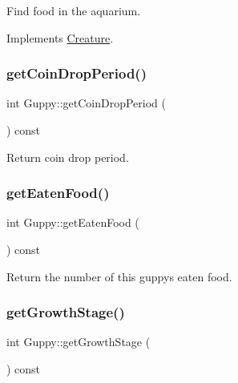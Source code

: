 Find food in the aquarium. 



Implements \mbox{\hyperlink{class_creature_a0d531a4c04c1021833ddb0e48864dbf4}{Creature}}.

\mbox{\label{class_guppy_a30d6fd06e3960eb1ea078bccdd23e12e}} 
\subsubsection{\texorpdfstring{get\+Coin\+Drop\+Period()}{getCoinDropPeriod()}}
{\footnotesize\ttfamily int Guppy\+::get\+Coin\+Drop\+Period (\begin{DoxyParamCaption}{ }\end{DoxyParamCaption}) const}



Return coin drop period. 

\mbox{\label{class_guppy_a0a57ee7e3bee04fb9dfe261e7f0f551e}} 
\subsubsection{\texorpdfstring{get\+Eaten\+Food()}{getEatenFood()}}
{\footnotesize\ttfamily int Guppy\+::get\+Eaten\+Food (\begin{DoxyParamCaption}{ }\end{DoxyParamCaption}) const}



Return the number of this guppy\textquotesingle{}s eaten food. 

\mbox{\label{class_guppy_a786cdeea3d03f342cedaedf85339ba20}} 
\subsubsection{\texorpdfstring{get\+Growth\+Stage()}{getGrowthStage()}}
{\footnotesize\ttfamily int Guppy\+::get\+Growth\+Stage (\begin{DoxyParamCaption}{ }\end{DoxyParamCaption}) const}



